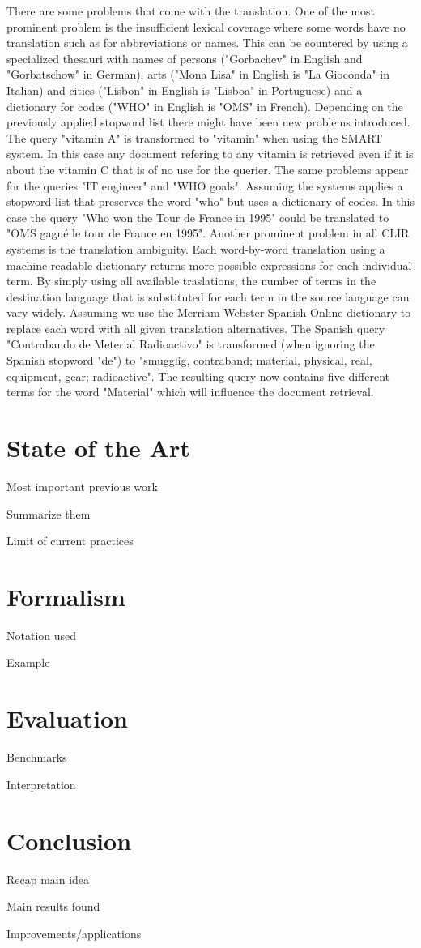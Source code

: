 \documentclass[journal]{IEEEtran}
\begin{document}
There are some problems that come with the translation. One of the most prominent problem is the insufficient lexical coverage where some words have no translation such as for abbreviations or names. This can be countered by using a specialized thesauri with names of persons ("Gorbachev" in English and "Gorbatschow" in German), arts ("Mona Lisa" in English is "La Gioconda" in Italian) and cities ("Lisbon" in English is "Lisboa" in Portuguese) and a dictionary for codes ("WHO" in English is "OMS" in French).
Depending on the previously applied stopword list there might have been new problems introduced. The query "vitamin A" is transformed to "vitamin" when using the SMART system. In this case any document refering to any vitamin is retrieved even if it is about the vitamin C that is of no use for the querier. The same problems appear for the queries "IT engineer" and "WHO goals".
Assuming the systems applies a stopword list that preserves the word "who" but uses a dictionary of codes. In this case the query "Who won the Tour de France in 1995" could be translated to "OMS gagn\'{e} le tour de France en 1995".
Another prominent problem in all CLIR systems is the translation ambiguity. Each word-by-word translation using a machine-readable dictionary returns more possible expressions for each individual term. By simply using all available traslations, the number of terms in the destination language that is substituted for each term in the source language can vary widely. Assuming we use the Merriam-Webster Spanish Online dictionary to replace each word with all given translation alternatives. The Spanish query "Contrabando de Meterial Radioactivo" is transformed (when ignoring the Spanish stopword "de") to "smugglig, contraband; material, physical, real, equipment, gear; radioactive". The resulting query now contains five different terms for the word "Material" which will influence the document retrieval.

\section{State of the Art}

Most important previous work

Summarize them

Limit of current practices



\section{Formalism}
Notation used

Example



\section{Evaluation}
Benchmarks

Interpretation



\section{Conclusion}
Recap main idea

Main results found

Improvements/applications

\cite{gollins01}
\cite{peters12}
\cite{savoy09}
\cite{yu09}



\end{document}
